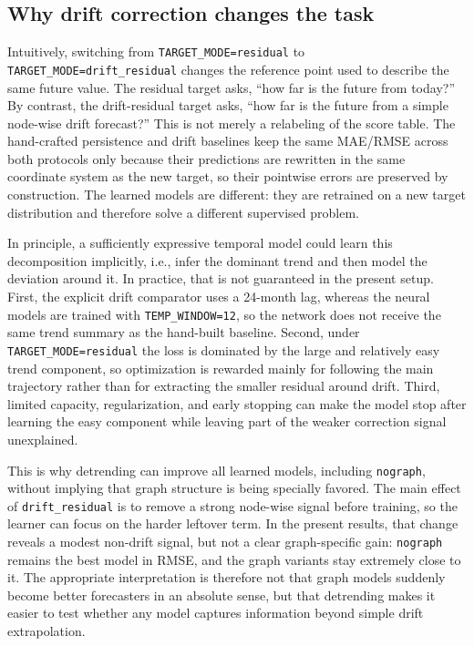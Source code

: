 \documentclass[pdflatex,sn-basic]{sn-jnl}
\begin{document}
\subsection{Why drift correction changes the task}
Intuitively, switching from \texttt{TARGET\_MODE=residual} to \texttt{TARGET\_MODE=drift\_residual} changes the reference point used to describe the same future value. The residual target asks, ``how far is the future from today?'' By contrast, the drift-residual target asks, ``how far is the future from a simple node-wise drift forecast?'' This is not merely a relabeling of the score table. The hand-crafted persistence and drift baselines keep the same MAE/RMSE across both protocols only because their predictions are rewritten in the same coordinate system as the new target, so their pointwise errors are preserved by construction. The learned models are different: they are retrained on a new target distribution and therefore solve a different supervised problem.

In principle, a sufficiently expressive temporal model could learn this decomposition implicitly, i.e., infer the dominant trend and then model the deviation around it. In practice, that is not guaranteed in the present setup. First, the explicit drift comparator uses a 24-month lag, whereas the neural models are trained with \texttt{TEMP\_WINDOW=12}, so the network does not receive the same trend summary as the hand-built baseline. Second, under \texttt{TARGET\_MODE=residual} the loss is dominated by the large and relatively easy trend component, so optimization is rewarded mainly for following the main trajectory rather than for extracting the smaller residual around drift. Third, limited capacity, regularization, and early stopping can make the model stop after learning the easy component while leaving part of the weaker correction signal unexplained.

This is why detrending can improve all learned models, including \texttt{nograph}, without implying that graph structure is being specially favored. The main effect of \texttt{drift\_residual} is to remove a strong node-wise signal before training, so the learner can focus on the harder leftover term. In the present results, that change reveals a modest non-drift signal, but not a clear graph-specific gain: \texttt{nograph} remains the best model in RMSE, and the graph variants stay extremely close to it. The appropriate interpretation is therefore not that graph models suddenly become better forecasters in an absolute sense, but that detrending makes it easier to test whether any model captures information beyond simple drift extrapolation.
\end{document}
